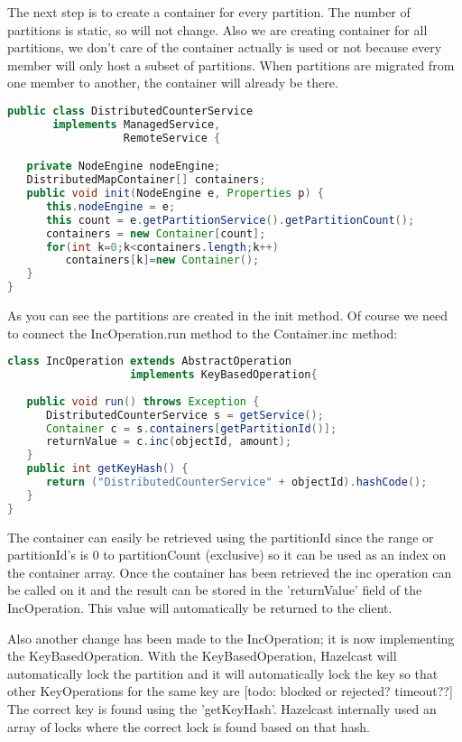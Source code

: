 The next step is to create a container for every partition. The number of partitions is static, so will not change. Also we are creating container for all partitions, we don't care of the container actually is used or not because every member will only host a subset of partitions. When partitions are migrated from one member to another, the container will already be there.
\begin{lstlisting}[language=java]
public class DistributedCounterService 
       implements ManagedService, 
                  RemoteService {

   private NodeEngine nodeEngine;
   DistributedMapContainer[] containers;
   public void init(NodeEngine e, Properties p) {
      this.nodeEngine = e;
      this count = e.getPartitionService().getPartitionCount();
      containers = new Container[count];
      for(int k=0;k<containers.length;k++) 
         containers[k]=new Container();
   }
}
\end{lstlisting}
As you can see the partitions are created in the init method. Of course we need to connect the IncOperation.run method to the Container.inc method:
\begin{lstlisting}[language=java]
class IncOperation extends AbstractOperation 
                   implements KeyBasedOperation{
   
   public void run() throws Exception {
      DistributedCounterService s = getService();
      Container c = s.containers[getPartitionId()];
      returnValue = c.inc(objectId, amount);
   }
   public int getKeyHash() {
      return ("DistributedCounterService" + objectId).hashCode();
   }
}
\end{lstlisting}
The container can easily be retrieved using the partitionId since the range or partitionId's is 0 to partitionCount (exclusive) so it can be used as an index on the container array. Once the container has been retrieved the inc operation can be called on it and the result can be stored in the 'returnValue' field of the IncOperation. This value will automatically be returned to the client.

Also another change has been made to the IncOperation; it is now implementing the KeyBasedOperation. With the KeyBasedOperation, Hazelcast will automatically lock the partition and it will automatically lock the key so that other KeyOperations for the same key are [todo: blocked or rejected? timeout??] The correct key is found using the 'getKeyHash'. Hazelcast internally used an array of locks where the correct lock is found based on that hash. 

